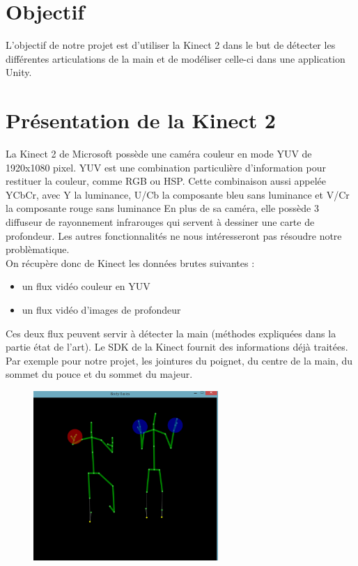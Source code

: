 \section{Objectif}
L'objectif de notre projet est d'utiliser la Kinect 2 dans le but de détecter les différentes articulations
de la main et de modéliser celle-ci dans une application Unity.

\section{Présentation de la Kinect 2}
La Kinect 2 de Microsoft possède une caméra couleur en mode YUV de 1920x1080 pixel.
YUV est une combination particulière d'information pour restituer la couleur, comme RGB ou HSP.
Cette combinaison aussi appelée YCbCr, avec Y la luminance, U/Cb la composante bleu sans luminance et V/Cr la composante rouge sans luminance
En plus de sa caméra, elle possède 3 diffuseur de rayonnement infrarouges qui servent à dessiner une carte de profondeur.
Les autres fonctionnalités ne nous intéresseront pas résoudre notre problèmatique.\\

On récupère donc de Kinect les données brutes suivantes : 
\begin{itemize}
 \item un flux vidéo couleur en YUV
 \item un flux vidéo d'images de profondeur
\end{itemize}

Ces deux flux peuvent servir à détecter la main (méthodes expliquées dans la partie état de l'art).
Le SDK de la Kinect fournit des informations déjà traitées. 
Par exemple pour notre projet, les jointures du poignet, du centre de la main, du sommet du pouce et du sommet du majeur.

\begin{figure}[!h]
\center
\includegraphics[width=7cm]{images/kinec2_skel.png}
\end{figure}

